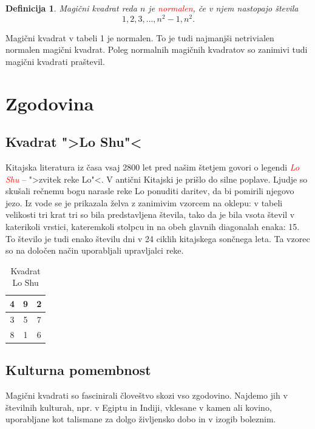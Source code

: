 \documentclass[a4paper,12pt]{article}
\newtheorem{definicija}[izrek]{Definicija}
\begin{document}
\begin{definicija}
   Magični kvadrat reda $n$ je \textcolor{red}{\emph{normalen}}, če v njem nastopajo števila
   \begin{equation}
      \label{eq:numbers}
      1, 2, 3, \ldots, n^2-1, n^2.
   \end{equation}
\end{definicija}

Magični kvadrat v tabeli 1 je normalen.
To je tudi najmanjši netrivialen normalen magični kvadrat.
Poleg normalnih magičnih kvadratov so zanimivi tudi magični kvadrati praštevil.

\section{Zgodovina}

\subsection{Kvadrat ">Lo Shu"<}

Kitajska literatura iz časa vsaj 2800 let pred našim štetjem govori o legendi
\textcolor{red}{\emph{Lo Shu}} -- ">zvitek reke Lo"<. V antični Kitajski je prišlo do
silne poplave. Ljudje so skušali rečnemu bogu narasle reke Lo ponuditi daritev,
da bi pomirili njegovo jezo. Iz vode se je prikazala želva z zanimivim vzorcem
na oklepu: v tabeli velikosti tri krat tri so bila predstavljena števila, tako
da je bila vsota števil v katerikoli vrstici, kateremkoli stolpcu in na obeh
glavnih diagonalah enaka: 15. To število je tudi enako številu dni v 24 ciklih
kitajskega sončnega leta. Ta vzorec so na določen način uporabljali upravljalci
reke.

\begin{table}[h]
   \centering
   \large
   \caption{Kvadrat Lo Shu}
   \begin{tabular}{|c|c|c|}
      \hline
         4 & 9 & 2 \\\hline
         3 & 5 & 7 \\\hline
         8 & 1 & 6 \\\hline
   \end{tabular}
   \label{table:loshu}
\end{table}

\subsection{Kulturna pomembnost}

Magični kvadrati so fascinirali človeštvo skozi vso zgodovino. Najdemo jih
v številnih kulturah, npr. v Egiptu in Indiji, vklesane v kamen ali
kovino, uporabljane kot talismane za dolgo življensko dobo in v
izogib boleznim.
\end{document}
